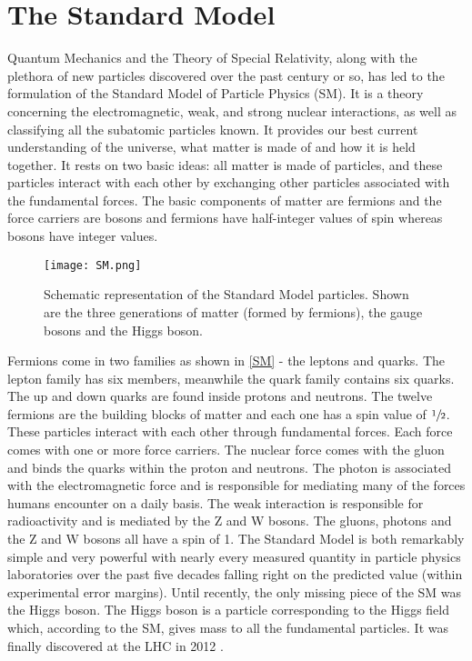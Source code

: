 \section{The Standard Model}

Quantum Mechanics and the Theory of Special Relativity, along with the plethora of new particles discovered over the past century or so, has led to the formulation of the Standard Model of Particle Physics (SM)\cite{SM1}. It is a theory concerning the electromagnetic, weak\cite{EWT}, and strong nuclear interactions\cite{QCD}, as well as classifying all the subatomic particles known. It provides our best current understanding of the universe, what matter is made of and how it is held together. It rests on two basic ideas: all matter is made of particles, and these particles interact with each other by exchanging other particles associated with the fundamental forces. The basic components of matter are fermions and the force carriers are bosons and fermions have half-integer values of spin whereas bosons have integer values.

\begin{figure}[H]
\begin{center}
\texttt{[image: SM.png]}
\caption[Schematic representation of the Standard Model particles.]{Schematic representation of the Standard Model particles. Shown are the three generations of matter (formed by fermions), the gauge bosons and the Higgs boson.}
\label{SM} 
\end{center}
\end{figure}

Fermions come in two families as shown in \autoref{SM} - the leptons and quarks. The lepton family has six members, meanwhile the quark family contains six quarks. The up and down quarks are found inside protons and neutrons. The twelve fermions are the building blocks of matter and each one has a spin value of $\sfrac{1}{2}$. These particles interact with each other through fundamental forces. Each force comes with one or more force carriers. The nuclear force comes with the gluon and binds the quarks within the proton and neutrons. The photon is associated with the electromagnetic force and is responsible for mediating many of the forces humans encounter on a daily basis. The weak interaction is responsible for radioactivity and is mediated by the Z and W bosons. The gluons, photons and the Z and W bosons all have a spin of 1. The Standard Model is both remarkably simple and very powerful with nearly every measured quantity in particle physics laboratories over the past five decades falling right on the predicted value (within experimental error margins)\cite{SM2,SM3}. Until recently, the only missing piece of the SM was the Higgs boson\cite{Higgs1}. The Higgs boson is a particle corresponding to the Higgs field which, according to the SM, gives mass to all the fundamental particles. It was finally discovered at the LHC in 2012 \cite{Higgs,Higgs2}.

